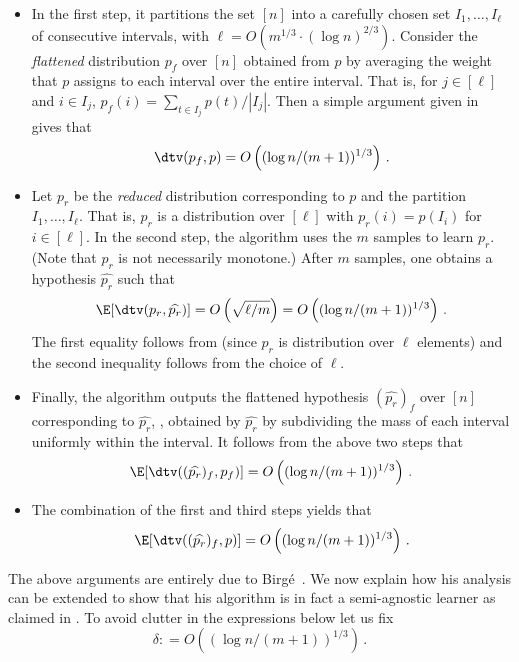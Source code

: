 \begin{itemize}
\item  In the first step, it partitions the set $[n]$ into a carefully chosen
set $I_1, \ldots, I_{\ell}$ of consecutive intervals, with $\ell = O(m^{1/3} \cdot (\log n)^{2/3})$.
Consider the \emph{flattened} distribution $p_f$ over $[n]$ obtained from $p$ by averaging the weight
that $p$ assigns to each interval over the entire interval. That is, for $j \in [\ell]$ and
$i \in I_j$, $p_f(i) = \sum_{t \in I_j} p(t) / |I_j|$.
Then a simple argument given in~\cite{Birge:87b} gives
that 
\[
\dtv(p_f, p) = O\left( ({\log n / (m+1)})^{1/3} \right)\,.
\]


\item Let $p_r$ be the \emph{reduced} distribution corresponding to $p$ and the partition $I_1, \ldots, I_{\ell}$.
That is, $p_r$ is a distribution over $[\ell]$ with $p_r(i) = p(I_i)$ for $i \in [\ell]$. In the second step, the algorithm uses the $m$ samples to learn $p_r$. (Note that $p_r$ is not necessarily monotone.)
After $m$ samples, one obtains a hypothesis $\widehat{p_r}$ such that
\[
\E [\dtv(p_r, \widehat{p_r})] =  O\left( \sqrt{\ell / m} \right) =
O\left( ({\log n / (m+1)})^{1/3} \right)\,.
\]
The first equality follows from  (since $p_r$ is distribution over $\ell$ elements) and
the second inequality follows from the choice of $\ell$.

\item Finally, the algorithm outputs the flattened hypothesis $(\widehat{p_r})_f$ over $[n]$
corresponding to  $\widehat{p_r}$, \ie, obtained by $\widehat{p_r}$ by subdividing
the mass of each interval uniformly within the interval. It follows from the above two steps that
\[
\E[\dtv ( (\widehat{p_r})_f, p_f)] =O\left( ({\log n / (m+1)})^{1/3}
\right)\,.
\]

\item The combination of the first and third steps yields that
\[
\E[\dtv ( (\widehat{p_r})_f, p)] =O\left( ({\log n / (m+1)})^{1/3}
\right)\,.
\]


\end{itemize}

\medskip

The above arguments are entirely due to Birg{\'e}~\cite{Birge:87b}.
We now explain how his analysis can be extended to show that his algorithm is
in fact a semi-agnostic learner as claimed in .
To avoid clutter in the expressions below let us fix
\[
\delta: =O\left( ({\log n / (m+1)})^{1/3} \right)\,.
\]

